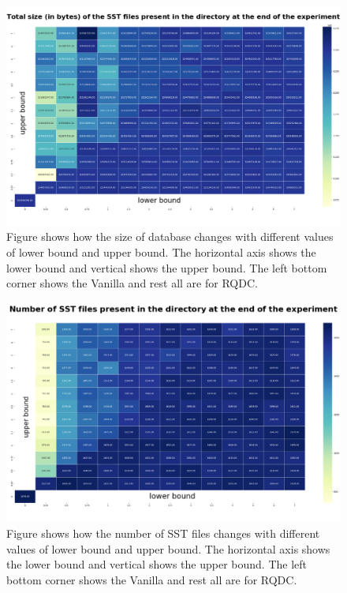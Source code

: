 \begin{figure}
    \centering
    \includegraphics[width=\linewidth]{Figures/size-of-database.png}
    \caption{Figure shows how the size of database changes with different values of lower bound and upper bound.
    The horizontal axis shows the lower bound and vertical shows the upper bound. The left bottom corner shows the 
    Vanilla and rest all are for RQDC.}\label{fig:db_size_for_different_ub_lb}
\end{figure}

\begin{figure}
    \centering
    \includegraphics[width=\linewidth]{Figures/number-of-sst-files.png}
    \caption{Figure shows how the number of SST files changes with different values of lower bound and upper bound.
    The horizontal axis shows the lower bound and vertical shows the upper bound. The left bottom corner shows the 
    Vanilla and rest all are for RQDC.}\label{fig:number_of_sst_files_ub_lb}
\end{figure}

